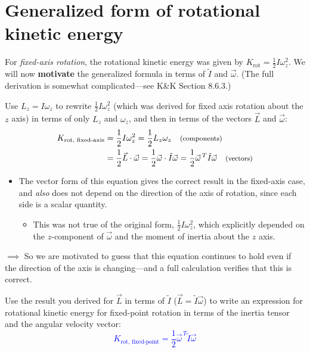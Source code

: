 \documentclass[11pt, letterpaper, openany]{book}
\newenvironment{exercise}[1][Exercise]{%
  \tcolorbox[blanker, breakable, left=1em,
    before skip=1em, after skip=1em,
    borderline west={3pt}{0pt}{PhysNavy},
    colback=PhysCream,
    before upper={\textcolor{PhysNavy}{\sffamily\bfseries #1:}\space}
  ]%
}{%
  \endtcolorbox%
}
\begin{document}
\section*{Generalized form of rotational kinetic energy}

For \textit{fixed-axis rotation}, the rotational kinetic energy was given by $K_{\text{rot}} = \frac{1}{2}I\omega_z^2$. We will now \textbf{motivate} the generalized formula in terms of $\tilde{I}$ and $\vec{\omega}$. (The full derivation is somewhat complicated---see K\&K Section 8.6.3.)

\begin{exercise}[Exercise 4]
Use $L_z = I\omega_z$ to rewrite $\frac{1}{2}I\omega_z^2$ (which was derived for fixed axis rotation about the $z$ axis) in terms of only $L_z$ and $\omega_z$, and then in terms of the vectors $\vec{L}$ and $\vec{\omega}$: \\
\textcolor{blue}{
\begin{align*}
    K_{\text{rot, fixed-axis}} &= \frac{1}{2}I\omega_z^2 = \frac{1}{2}L_z\omega_z \quad \text{\footnotesize{(components)}} \\
    &= \frac{1}{2}\vec{L} \cdot \vec{\omega} = \frac{1}{2}\vec{\omega} \cdot \tilde{I}\vec{\omega} = \frac{1}{2}\vec{\omega}^{\,T}\tilde{I}\vec{\omega} \quad \text{\footnotesize{(vectors)}}
\end{align*}
}
\begin{itemize}
    \item The vector form of this equation gives the correct result in the fixed-axis case, and \textit{also} does not depend on the direction of the axis of rotation, since each side is a scalar quantity.
    \begin{itemize}
        \item This was not true of the original form, $\frac{1}{2}I\omega_z^2$, which explicitly depended on the $z$-component of $\vec{\omega}$ and the moment of inertia about the $z$ axis.
    \end{itemize}
\end{itemize}
$\implies$ So we are motivated to guess that this equation continues to hold even if the direction of the axis is changing---and a full calculation verifies that this is correct.
\end{exercise}

\begin{exercise}[Exercise 5]
Use the result you derived for $\vec{L}$ in terms of $\tilde{I}$ ($\vec{L} = \tilde{I}\vec{\omega}$) to write an expression for rotational kinetic energy for fixed-point rotation in terms of the inertia tensor and the angular velocity vector: \\
\textcolor{blue}{
\[ K_{\text{rot, fixed-point}} = \frac{1}{2}\vec{\omega}^{\,T}\tilde{I}\vec{\omega} \]
}
\end{exercise}
\end{document}
